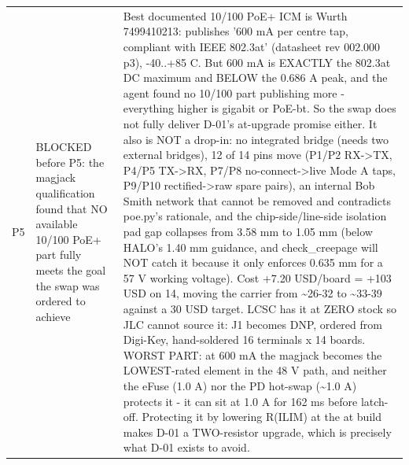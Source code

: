 \documentclass[11pt,a4paper]{article}
\begin{document}
{\begin{longtable}{lp{5.2cm}p{7.2cm}}
P5 & BLOCKED before P5: the magjack qualification found that NO available 10/100 PoE+ part fully meets the goal the swap was ordered to achieve & Best documented 10/100 PoE+ ICM is Wurth 7499410213: publishes '600 mA per centre tap, compliant with IEEE 802.3at' (datasheet rev 002.000 p3), -40..+85 C. But 600 mA is EXACTLY the 802.3at DC maximum and BELOW the 0.686 A peak, and the agent found no 10/100 part publishing more - everything higher is gigabit or PoE-bt. So the swap does not fully deliver D-01's at-upgrade promise either. It also is NOT a drop-in: no integrated bridge (needs two external bridges), 12 of 14 pins move (P1/P2 RX-\textgreater{}TX, P4/P5 TX-\textgreater{}RX, P7/P8 no-connect-\textgreater{}live Mode A taps, P9/P10 rectified-\textgreater{}raw spare pairs), an internal Bob Smith network that cannot be removed and contradicts poe.py's rationale, and the chip-side/line-side isolation pad gap collapses from 3.58 mm to 1.05 mm (below HALO's 1.40 mm guidance, and check\_creepage will NOT catch it because it only enforces 0.635 mm for a 57 V working voltage). Cost +7.20 USD/board = +103 USD on 14, moving the carrier from \textasciitilde{}26-32 to \textasciitilde{}33-39 against a 30 USD target. LCSC has it at ZERO stock so JLC cannot source it: J1 becomes DNP, ordered from Digi-Key, hand-soldered 16 terminals x 14 boards. WORST PART: at 600 mA the magjack becomes the LOWEST-rated element in the 48 V path, and neither the eFuse (1.0 A) nor the PD hot-swap (\textasciitilde{}1.0 A) protects it - it can sit at 1.0 A for 162 ms before latch-off. Protecting it by lowering R(ILIM) at the at build makes D-01 a TWO-resistor upgrade, which is precisely what D-01 exists to avoid. \\

\end{longtable}}
\end{document}
